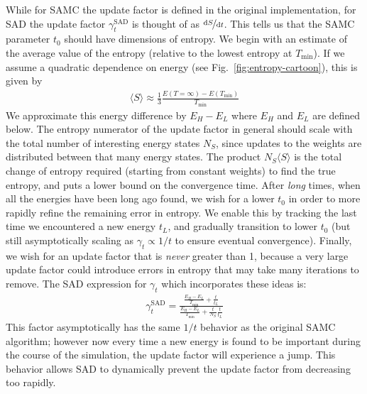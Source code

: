 \documentclass[letterpaper,twocolumn,amsmath,amssymb,pre,aps,10pt]{revtex4-1}
\begin{document}
While for SAMC the update factor is defined in the original
implementation, for SAD the update factor $\gamma_{t}^{\text{SAD}}$ is
thought of as $\nicefrac{\text{d}S}{\text{d}t}$. This tells us that
the SAMC parameter
$t_0$ should have dimensions of entropy.
We begin with an estimate of the average value of the entropy (relative
to the lowest entropy at $T_{\min}$).  If we assume a quadratic
dependence on energy (see Fig.~\ref{fig:entropy-cartoon}), this is given by
\begin{align}
\langle S\rangle \approx \frac13 \frac{E({T=\infty}) - E(T_{\min})}{T_{\min}}
\end{align}
We approximate this energy difference by
$E_H -E_L$ where $E_H$ and $E_L$ are defined below.
The entropy numerator of the update factor
in general should scale with the total number of interesting
energy states $N_S$, since updates to the weights are distributed between
that many energy states.  The product $N_S\langle S\rangle$ is the
total change of entropy required (starting from constant weights) to find
the true entropy, and puts a lower bound on the convergence time.
After \emph{long} times, when
all the energies have been long ago found,
we wish for a lower $t_0$ in order to more rapidly refine the remaining
error in entropy.  We enable this
by tracking the last time we encountered a new energy $t_L$, and
gradually transition to lower $t_0$ (but still asymptotically scaling
as $\gamma_t \propto 1/t$ to ensure eventual convergence).  Finally,
we wish for an update factor that is \emph{never} greater than 1, because
a very large update factor could introduce errors in entropy that may take
many iterations to remove.  The SAD
expression for $\gamma_t$ which incorporates these ideas is:
\begin{align}
  \gamma_{t}^{\text{SAD}} =
     \frac{
       \frac{E_{H}-E_{L}}{T_{\text{min}}} + \frac{t}{t_L}
     }{
       \frac{E_{H}-E_{L}}{T_{\text{min}}} + \frac{t}{N_S}\frac{t}{t_L}
     }
\end{align}
This factor asymptotically has the same $1/t$ behavior as the original
SAMC algorithm;
however now every time a new energy is found to be important
during the course of
the simulation, the update factor will experience a jump. This behavior
allows SAD to dynamically prevent the update factor from decreasing too
rapidly.
\end{document}
